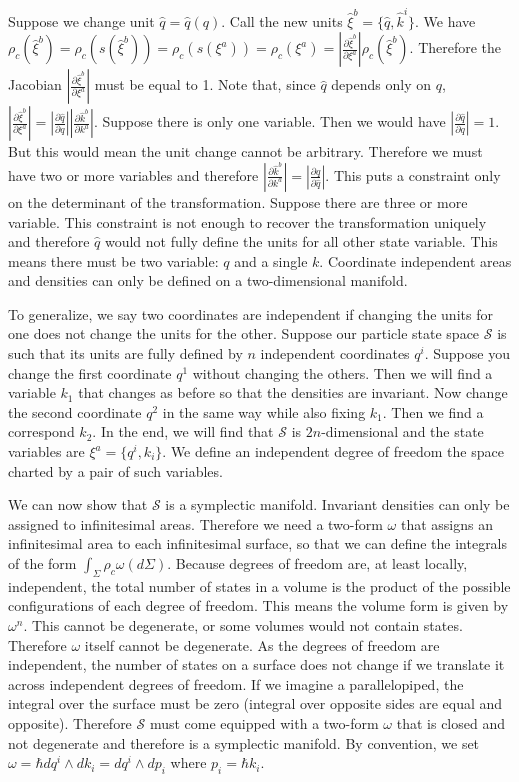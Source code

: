 \documentclass[letterpaper]{article}
\begin{document}
Suppose we change unit $\hat{q}=\hat{q}(q)$. Call the new units $\hat{\xi}^b = \{ \hat{q}, \hat{k}^i\}$. We have $\rho_c(\hat{\xi}^b)=\rho_c(s(\hat{\xi}^b))=\rho_c(s(\xi^a))=\rho_c(\xi^a) = \left|\frac{\partial \hat{\xi}^b}{\partial \xi^a} \right| \rho_c(\hat\xi^b)$. Therefore the Jacobian $\left|\frac{\partial \hat{\xi}^b}{\partial \xi^a} \right|$ must be equal to 1. Note that, since $\hat{q}$ depends only on $q$, $\left|\frac{\partial \hat{\xi}^b}{\partial \xi^a} \right| = \left|\frac{\partial \hat q}{\partial q} \right|\left|\frac{\partial \hat{k}^b}{\partial k^a} \right|$. Suppose there is only one variable. Then we would have $\left|\frac{\partial \hat q}{\partial q} \right| = 1$. But this would mean the unit change cannot be arbitrary. Therefore we must have two or more variables and therefore $\left|\frac{\partial \hat{k}^b}{\partial k^a} \right| = \left|\frac{\partial q}{\partial \hat q} \right|$. This puts a constraint only on the determinant of the transformation. Suppose there are three or more variable. This constraint is not enough to recover the transformation uniquely and therefore $\hat q$  would not fully define the units for all other state variable. This means there must be two variable: $q$ and a single $k$. Coordinate independent areas and densities can only be defined on a two-dimensional manifold.

To generalize, we say two coordinates are independent if changing the units for one does not change the units for the other. Suppose our particle state space $\mathcal{S}$ is such that its units are fully defined by $n$ independent coordinates $q^i$. Suppose you change the first coordinate $q^1$ without changing the others. Then we will find a variable $k_1$ that changes as before so that the densities are invariant. Now change the second coordinate $q^2$ in the same way while also fixing $k_1$. Then we find a correspond $k_2$. In the end, we will find that $\mathcal{S}$ is $2n$-dimensional and the state variables are $\xi^a = \{ q^i, k_i \}$. We define an independent degree of freedom the space charted by a pair of such variables.

We can now show that $\mathcal{S}$ is a symplectic manifold. Invariant densities can only be assigned to infinitesimal areas. Therefore we need a two-form $\omega$ that assigns an infinitesimal area to each infinitesimal surface, so that we can define the integrals of the form $\int_{\Sigma} \rho_c \omega(d\Sigma)$. Because degrees of freedom are, at least locally, independent, the total number of states in a volume is the product of the possible configurations of each degree of freedom. This means the volume form is given by $\omega^n$. This cannot be degenerate, or some volumes would not contain states. Therefore $\omega$ itself cannot be degenerate. As the degrees of freedom are independent, the number of states on a surface does not change if we translate it across independent degrees of freedom. If we imagine a parallelopiped, the integral over the surface must be zero (integral over opposite sides are equal and opposite). Therefore $\mathcal{S}$ must come equipped with a two-form $\omega$ that is closed and not degenerate and therefore is a symplectic manifold. By convention, we set $\omega = \hbar dq^i \wedge dk_i = dq^i \wedge dp_i$ where $p_i = \hbar k_i$.
\end{document}
